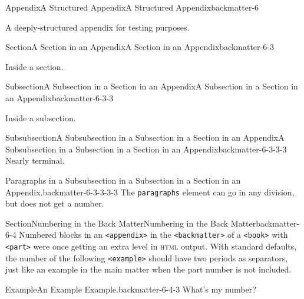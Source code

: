 \documentclass[oneside,10pt,]{book}
\newcommand{\mono}[1]{\texttt{#1}}
\newcommand{\initialism}[1]{\textsc{\MakeLowercase{#1}}}
\numberwithin{equation}{section}
\begin{document}
\begin{appendixptx}{Appendix}{A Structured Appendix}{}{A Structured Appendix}{}{}{backmatter-6}
\renewcommand*{\appendixname}{Appendix}
\begin{introduction}{}%
A deeply-structured appendix for testing purposes.%
\end{introduction}%
%
%
\typeout{************************************************}
\typeout{************************************************}
%
\begin{sectionptx}{Section}{A Section in an Appendix}{}{A Section in an Appendix}{}{}{backmatter-6-3}
\begin{introduction}{}%
Inside a section.%
\end{introduction}%
%
%
\typeout{************************************************}
\typeout{************************************************}
%
\begin{subsectionptx}{Subsection}{A Subsection in a Section in an Appendix}{}{A Subsection in a Section in an Appendix}{}{}{backmatter-6-3-3}
\begin{introduction}{}%
Inside a subsection.%
\end{introduction}%
%
%
\typeout{************************************************}
\typeout{************************************************}
%
\begin{subsubsectionptx}{Subsubsection}{A Subsubsection in a Subsection in a Section in an Appendix}{}{A Subsubsection in a Subsection in a Section in an Appendix}{}{}{backmatter-6-3-3-3}
Nearly terminal.%
\begin{paragraphs}{Paragraphs in a Subsubsection in a Subsection in a Section in an Appendix.}{backmatter-6-3-3-3-3}%
The \mono{paragraphs} element can go in any division, but does not get a number.%
\end{paragraphs}%
\end{subsubsectionptx}
\end{subsectionptx}
\end{sectionptx}
%
%
\typeout{************************************************}
\typeout{************************************************}
%
\begin{sectionptx}{Section}{Numbering in the Back Matter}{}{Numbering in the Back Matter}{}{}{backmatter-6-4}
Numbered blocks in an \mono{<appendix>} in the \mono{<backmatter>} of a \mono{<book>} with \mono{<part>} were once getting an extra level in \initialism{HTML} output.  With standard defaults, the number of the following \mono{<example>} should have two periods as separators, just like an example in the main matter when the part number is not included.%
\begin{example}{Example}{An Example Example.}{backmatter-6-4-3}%
What's my number?%
\end{example}
\end{sectionptx}
\end{appendixptx}
\end{document}
